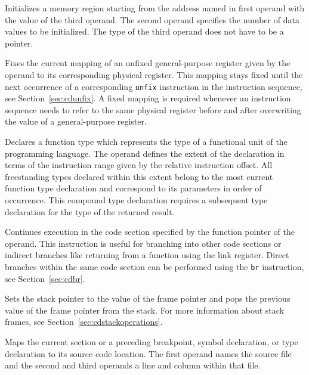 
Initializes a memory region starting from the address named in first operand with the value of the third operand.
The second operand specifies the number of data values to be initialized.
The type of the third operand does not have to be a pointer.


Fixes the current mapping of an unfixed general-purpose register given by the operand to its corresponding physical register.
This mapping stays fixed until the next occurrence of a corresponding \texttt{unfix} instruction in the instruction sequence, see Section~\ref{sec:cdunfix}.
A fixed mapping is required whenever an instruction sequence needs to refer to the same physical register before and after overwriting the value of a general-purpose register.


Declares a function type which represents the type of a functional unit of the programming language.
The operand defines the extent of the declaration in terms of the instruction range given by the relative instruction offset.
All freestanding types declared within this extent belong to the most current function type declaration and correspond to its parameters in order of occurrence.
This compound type declaration requires a subsequent type declaration for the type of the returned result.


Continues execution in the code section specified by the function pointer of the operand.
This instruction is useful for branching into other code sections or indirect branches like returning from a function using the link register.
Direct branches within the same code section can be performed using the \texttt{br} instruction, see Section~\ref{sec:cdbr}.


Sets the stack pointer to the value of the frame pointer and pops the previous value of the frame pointer from the stack.
For more information about stack frames, see Section~\ref{sec:cdstackoperations}.


Maps the current section or a preceding breakpoint, symbol declaration, or type declaration to its source code location.
The first operand names the source file and the second and third operands a line and column within that file.

